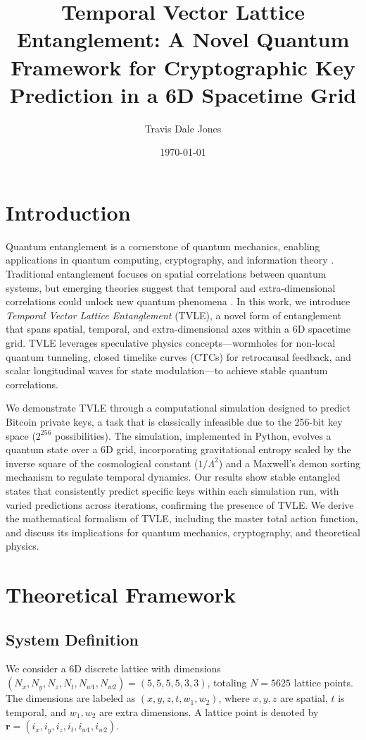 \documentclass[aps,prl,twocolumn,superscriptaddress]{revtex4-2}
\title{Temporal Vector Lattice Entanglement: A Novel Quantum Framework for Cryptographic Key Prediction in a 6D Spacetime Grid}
\author{Travis Dale Jones}
\affiliation{Independent Researcher, [City, Country]}
\date{\today}
\begin{document}
\maketitle

\section{Introduction}
Quantum entanglement is a cornerstone of quantum mechanics, enabling applications in quantum computing, cryptography, and information theory \cite{nielsen2010quantum}. Traditional entanglement focuses on spatial correlations between quantum systems, but emerging theories suggest that temporal and extra-dimensional correlations could unlock new quantum phenomena \cite{horava2009quantum}. In this work, we introduce \textit{Temporal Vector Lattice Entanglement} (TVLE), a novel form of entanglement that spans spatial, temporal, and extra-dimensional axes within a 6D spacetime grid. TVLE leverages speculative physics concepts—wormholes for non-local quantum tunneling, closed timelike curves (CTCs) for retrocausal feedback, and scalar longitudinal waves for state modulation—to achieve stable quantum correlations.

We demonstrate TVLE through a computational simulation designed to predict Bitcoin private keys, a task that is classically infeasible due to the 256-bit key space (\(2^{256}\) possibilities). The simulation, implemented in Python, evolves a quantum state over a 6D grid, incorporating gravitational entropy scaled by the inverse square of the cosmological constant (\(1/\Lambda^2\)) and a Maxwell’s demon sorting mechanism to regulate temporal dynamics. Our results show stable entangled states that consistently predict specific keys within each simulation run, with varied predictions across iterations, confirming the presence of TVLE. We derive the mathematical formalism of TVLE, including the master total action function, and discuss its implications for quantum mechanics, cryptography, and theoretical physics.

\section{Theoretical Framework}

\subsection{System Definition}
We consider a 6D discrete lattice with dimensions \((N_x, N_y, N_z, N_t, N_{w1}, N_{w2}) = (5, 5, 5, 5, 3, 3)\), totaling \(N = 5625\) lattice points. The dimensions are labeled as \((x, y, z, t, w_1, w_2)\), where \(x, y, z\) are spatial, \(t\) is temporal, and \(w_1, w_2\) are extra dimensions. A lattice point is denoted by \(\mathbf{r} = (i_x, i_y, i_z, i_t, i_{w1}, i_{w2})\).
\end{document}

